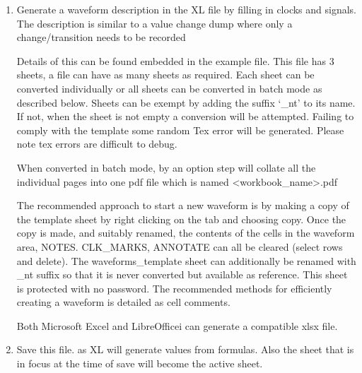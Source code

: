 \documentclass[letterpaper,10pt,english]{sphinxmanual}
\begin{document}
\begin{enumerate}
\item {} 
Generate a waveform description in the XL file by filling in clocks and
signals.  The description is similar to a value change dump where only a
change/transition needs to be recorded

Details of this can be found embedded in the example
 file. This file has 3 sheets, a file can have as
many sheets as required.  Each sheet can be converted individually or all
sheets can be converted in batch mode as described below.  Sheets can be
exempt by adding the suffix ‘\_nt’ to its name.  If not, when the sheet is
not empty a conversion will be attempted. Failing to comply with the
template some random Tex error will be generated.  Please note tex errors
are difficult to debug.

When converted in batch mode, by  an option step will collate all the
individual pages into one pdf file which is named \textless{}workbook\_name\textgreater{}.pdf

The recommended approach to start a new waveform is by making a copy of the
template sheet by right clicking on the tab and choosing copy.  Once the copy
is made, and suitably renamed, the contents of the cells in the waveform area,
NOTES. CLK\_MARKS, ANNOTATE can all be cleared (select rows and delete).  The
waveforms\_template sheet can additionally be renamed with \_nt suffix so that it
is never converted but available as reference. This sheet is protected with no
password.  The recommended methods for efficiently creating a waveform is
detailed as cell comments.

Both Microsoft Excel and LibreOfficei can generate a compatible xlsx file.

\item {} 
Save this file.  as XL will generate values from formulas.
Also the sheet that is in focus at the time of save will become the active
sheet.

\end{enumerate}
\end{document}
